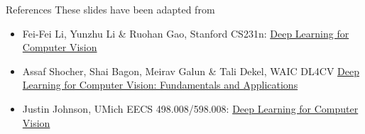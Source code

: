 \documentclass[10pt]{beamer}
\theoremstyle{remark}
\theoremstyle{definition}
\begin{document}
\begin{frame}{References}
These slides have been adapted from
\begin{itemize}
    \item Fei-Fei Li, Yunzhu Li \& Ruohan Gao, Stanford CS231n: \href{http://cs231n.stanford.edu/index.html}{Deep Learning for Computer Vision}
    \item Assaf Shocher, Shai Bagon, Meirav Galun \& Tali Dekel, WAIC DL4CV \href{https://dl4cv.github.io/index.html}{Deep Learning for Computer Vision: Fundamentals and Applications}
    \item Justin Johnson, UMich EECS 498.008/598.008: \href{https://web.eecs.umich.edu/~justincj/teaching/eecs498/WI2022/}{Deep Learning for Computer Vision}
\end{itemize}

\end{frame}

    
\end{document}
